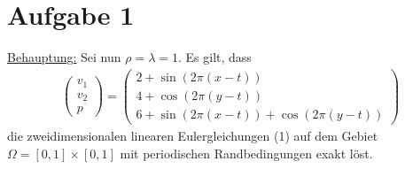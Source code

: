 \section*{Aufgabe 1}

\underline{Behauptung:} Sei nun $\rho =\lambda =1$. Es gilt, dass
\begin{align}
\label{eq:behauptung01}
\begin{pmatrix}
v_1\\
v_2\\
p
\end{pmatrix}
=
\begin{pmatrix}
2+\sin(2\pi(x-t))\\
4+\cos(2\pi(y-t))\\
6+\sin(2\pi(x-t))+\cos(2\pi(y-t))
\end{pmatrix}
\end{align}
die zweidimensionalen linearen Eulergleichungen (1) auf dem Gebiet
$\Omega=[0,1]\times[0,1]$ mit periodischen Randbedingungen exakt löst.

